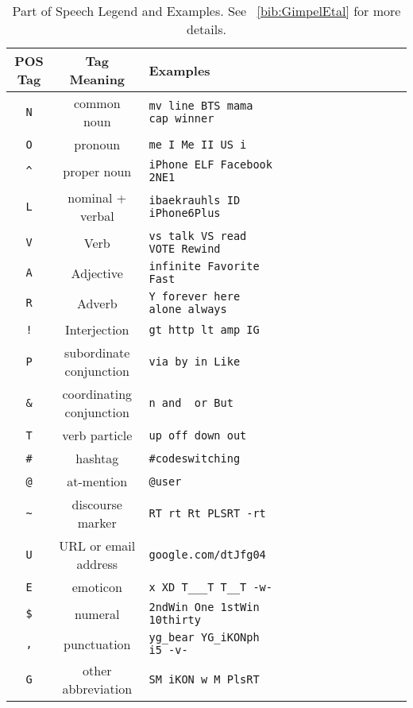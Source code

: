 \documentclass[conference]{IEEEtran}
\begin{document}
\begin{table}[h!] 
 \caption{Part of Speech Legend and Examples. See ~\ref{bib:GimpelEtal} for more details.}
\centering %
\begin{tabular}{c c l c c c rrrrrrr} %
\hline\hline %
POS Tag		&	Tag Meaning	& 	Examples	
\\ [0.5ex] 
\hline 
\verb|N| 	&	common noun & \verb|mv line BTS mama cap winner|	  	 \\ 
\verb|O|  	&	pronoun & 	 \verb|me I Me II US i| 	 \\ 
\verb|^| 	&	proper noun & 	 \verb|iPhone ELF Facebook  2NE1| 	 \\
\verb|L|  	&	nominal + verbal & 	 {\tt ibaekrauhls ID iPhone6Plus}	 \\
\verb|V|  	&	Verb & 	 \verb|vs talk VS read VOTE Rewind| 	 \\
\verb|A|  	&	Adjective & 	 \verb|infinite Favorite Fast|	 \\
\verb|R|  	&	Adverb & 	 \verb|Y forever here alone always| 	 \\
\verb|!|  	&	Interjection & 	 \verb|gt http lt amp IG| 	 \\ 
\verb|P|  	&	subordinate conjunction & 	 \verb|via by in Like| 	 \\ 
\verb|&|  	&	coordinating conjunction & 	\verb|n and  or But|	 \\ 
\verb|T|  	&	verb particle & 	 \verb|up off down out| 	 \\ 
\verb|#|  	&	hashtag & 	 \verb|#codeswitching| 	 \\ 
\verb|@|  	&	at-mention & 	 \verb|@user| 	 \\
\verb|~|  	&	discourse marker & 	 \verb|RT rt Rt PLSRT -rt| 	 \\ 
\verb|U|  	&	URL or email address & 	 \verb|google.com/dtJfg04| 	 \\ 
\verb|E|  	&	emoticon & 	 \verb|x XD T___T T__T -w-| 	 \\ 
\verb|$|  	&	numeral & 	  \verb|2ndWin One 1stWin 10thirty |  	 \\ 
\verb|,|  	&	punctuation & 	 \verb|yg_bear YG_iKONph i5 -v-| 	 \\ 
\verb|G|  	&	other abbreviation & 	 \verb|SM iKON w M PlsRT| 	 \\ 
\hline %
\end{tabular} 
\label{tab:pos_legend} 
\end{table} 
\end{document}
